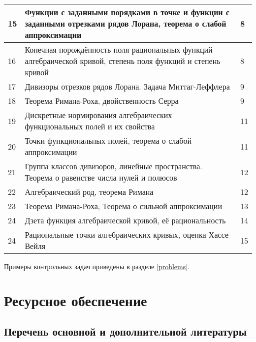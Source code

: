 \documentclass[a4paper, 12pt]{article}
\begin{document}
\begin{longtable}{ | p{0.5cm} | p{11.5cm} | p{2cm} | }
15 & Функции с заданными порядками в точке и функции с заданными отрезками рядов Лорана, теорема о слабой аппроксимации & 8 \\ \hline
16 & Конечная порождённость поля рациональных функций алгебраической кривой, степень поля функций и степень кривой & 8 \\ \hline
17 & Дивизоры отрезков рядов Лорана. Задача Миттаг-Леффлера & 9 \\ \hline
18 & Теорема Римана-Роха, двойственность Серра & 9 \\ \hline
19 & Дискретные нормирования алгебраических функциональных полей и их свойства & 11 \\ \hline
20 & Точки функциональных полей, теорема о слабой аппроксимации & 11 \\ \hline
21 & Группа классов дивизоров, линейные пространства. Теорема о равенстве числа нулей и полюсов & 12 \\ \hline
22 & Алгебраический род, теорема Римана & 12 \\ \hline
23 & Теорема Римана-Роха, Теорема о сильной аппроксимации & 13 \\ \hline
24 & Дзета функция алгебраической кривой, её рациональность & 14 \\ \hline
24 & Рациональные точки алгебраических кривых, оценка Хассе-Вейля & 15 \\ \hline

\end{longtable}

Примеры контрольных задач приведены в разделе \ref{problems}.

\section{Ресурсное обеспечение}

\subsection{Перечень основной и дополнительной литературы}
\end{document}
